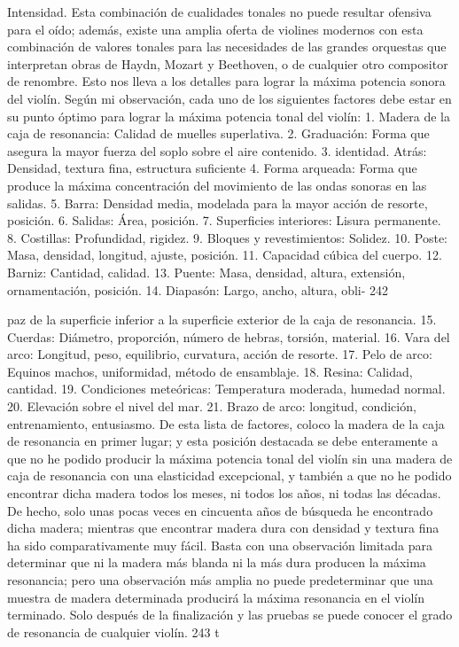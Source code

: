 Intensidad. Esta combinación de cualidades tonales no puede resultar ofensiva para el oído; además, existe una amplia oferta de violines modernos con esta combinación de valores tonales para las necesidades de las grandes orquestas que interpretan obras de Haydn, Mozart y Beethoven, o de cualquier otro compositor de renombre. Esto nos lleva a los detalles para lograr la máxima potencia sonora del violín.
Según mi observación, cada uno de los siguientes factores debe estar en su punto óptimo para lograr la máxima potencia tonal del violín:
1. Madera de la caja de resonancia: Calidad de muelles superlativa.
2. Graduación: Forma que asegura la mayor fuerza
del soplo sobre el aire contenido.
3. identidad.	Atrás:	Densidad, textura fina, estructura suficiente
4. Forma arqueada: Forma que produce la máxima concentración del movimiento de las ondas sonoras en las salidas.
5. Barra: Densidad media, modelada para la mayor
acción de resorte, posición.
6. Salidas: Área, posición.
7. Superficies interiores: Lisura permanente.
8. Costillas: Profundidad, rigidez.
9. Bloques y revestimientos: Solidez.
10. Poste: Masa, densidad, longitud, ajuste, posición.
11. Capacidad cúbica del cuerpo.
12. Barniz: Cantidad, calidad. 13. Puente: Masa, densidad, altura, extensión, ornamentación, posición. 14. Diapasón: Largo, ancho, altura, obli- 242

paz de la superficie inferior a la superficie exterior de la caja de resonancia.
15. Cuerdas: Diámetro, proporción, número de
hebras, torsión, material.
16. Vara del arco: Longitud, peso, equilibrio, curvatura, acción de resorte.
17. Pelo de arco: Equinos machos, uniformidad, método de
ensamblaje. 18. Resina: Calidad, cantidad.
19. Condiciones meteóricas: Temperatura moderada,
humedad normal.
20. Elevación sobre el nivel del mar.
21. Brazo de arco: longitud, condición, entrenamiento, entusiasmo.
De esta lista de factores, coloco la madera de la caja de resonancia en primer lugar; y esta posición destacada se debe enteramente a que no he podido producir la máxima potencia tonal del violín sin una madera de caja de resonancia con una elasticidad excepcional, y también a que no he podido encontrar dicha madera todos los meses, ni todos los años, ni todas las décadas. De hecho, solo unas pocas veces en cincuenta años de búsqueda he encontrado dicha madera; mientras que encontrar madera dura con densidad y textura fina ha sido comparativamente muy fácil. Basta con una observación limitada para determinar que ni la madera más blanda ni la más dura producen la máxima resonancia; pero una observación más amplia no puede predeterminar que una muestra de madera determinada producirá la máxima resonancia en el violín terminado. Solo después de la finalización y las pruebas se puede conocer el grado de resonancia de cualquier violín.
243
t

